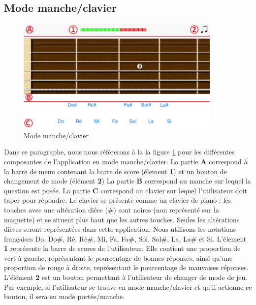 \documentclass{scrreprt}
\begin{document}
\subsection{Mode manche/clavier}

\begin{figure}[!h]
        \centering
        \includegraphics[width=10cm]{images/maquette_usecase/clavier/clavier_zones_ecran.png}
        \caption{Mode manche/clavier}
        \label{fig:clavier}
\end{figure}

Dans ce paragraphe, nous nous référerons à la la figure \ref{fig:clavier} pour les différentes composantes de l’application en mode manche/clavier.\newline
La partie \textbf{A} correspond à la barre de menu contenant la barre de score (élement \textbf{1}) et un bouton de changement de mode 
(élément \textbf{2})\newline
La partie \textbf{B} correspond au manche sur lequel la question est posée.\newline
La partie \textbf{C} correspond au clavier sur lequel l'utilisateur doit taper pour répondre. 
Le clavier se présente comme un clavier de piano : les touches avec une altération dièse (\#) sont noires (non représenté sur la maquette) et se
situent plus haut que les autres touches.
Seules les altérations dièses seront représentées dans cette application. Nous utilisons les notations françaises Do, Do\#, Ré, Ré\#, Mi, Fa, Fa\#, 
Sol, Sol\#, La, La\# et Si.\newline
L'élement \textbf{1} représente la barre de scores de l'utilisateur. Elle contient une proportion de vert à gauche, représentant le pourcentage de
bonnes réponses, 
ainsi qu'une proportion de rouge à droite, représentant le pourcentage de mauvaises réponses.\newline
L'élément \textbf{2} est un bouton permettant à l'utilisateur de changer de mode de jeu. Par exemple, si l'utilisateur se trouve en mode manche/clavier
et qu'il
actionne ce bouton, il sera en mode portée/manche.
\end{document}
